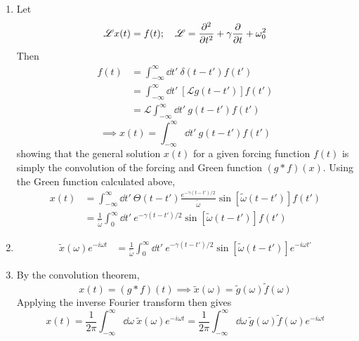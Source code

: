 \documentclass[12pt]{article}
\newcommand{\fullint}{\int_{-\infty}^\infty}
\newcommand{\fullintd}[1]{\fullint\dd#1\:}
\newcommand{\cint}[2]{\int_{#1}^{#2}}
\newcommand{\cintd}[3]{\cint{#1}{#2}\dd#3\:}
\begin{document}
\begin{enumerate}[label=(\alph*)]
\begin{center}
{
        }
    \end{center}
    Only the lower contour encloses the poles, thus
    \[ g(t,t') = i\Theta(t-t')\left[\frac{e^{-i\omega_+(t-t')}}{\omega_+ - \omega_-} + \frac{e^{-i\omega_-(t-t')}}{\omega_- - \omega_+}\right] = \boxed{\Theta(t-t')\frac{e^{-\gamma(t-t')/2}}{\tilde{\omega}}\sin[\tilde{\omega}(t-t')]} \]

    \item 
    Let 
    \[ \mathscr{L}x(t) = f(t); \quad \mathscr{L} = \pdv[2]{t} + \gamma\pdv{t} + \omega_0^2 \]
    Then
    \begin{align*}
        f(t) &= \fullintd{t'}\delta(t-t')f(t') \\
        &= \fullintd{t'}\left[\mathscr{L}g(t-t')\right]f(t') \\
        &= \mathscr{L}\fullintd{t'}g(t-t')f(t')
    \end{align*}
    \[ \implies x(t) = \fullintd{t'}g(t-t')f(t') \]
    showing that the general solution $x(t)$ for a given forcing function $f(t)$ is simply the convolution of the forcing and Green function $(g*f)(x)$. Using the Green function calculated above,
    \begin{align*}
        x(t) &= \fullintd{t'}\Theta(t-t')\frac{e^{-\gamma(t-t')/2}}{\tilde{\omega}}\sin[\tilde{\omega}(t-t')]f(t') \\
        &= \frac{1}{\tilde{\omega}}\cintd{0}{\infty}{t'}e^{-\gamma(t-t')/2}\sin[\tilde{\omega}(t-t')]f(t')
    \end{align*}

    \item
    \begin{align*}
        \tilde{x}(\omega)e^{-i\omega t} &= \frac{1}{\tilde{\omega}}\cintd{0}{\infty}{t'}e^{-\gamma(t-t')/2}\sin[\tilde{\omega}(t-t')]e^{-i\omega t'}
    \end{align*}

    \item
    By the convolution theorem,
    \[ x(t) = (g*f)(t) \implies \tilde{x}(\omega) = \tilde{g}(\omega)\tilde{f}(\omega) \]
    Applying the inverse Fourier transform then gives
    \[ x(t) = \frac{1}{2\pi}\fullintd{\omega}\tilde{x}(\omega)e^{-i\omega t} = \frac{1}{2\pi}\fullintd{\omega}\tilde{g}(\omega)\tilde{f}(\omega)e^{-i\omega t} \]

\end{enumerate}
\end{document}
